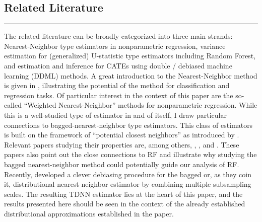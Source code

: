 \subsection{Related Literature}
\hrule
The related literature can be broadly categorized into three main strands: Nearest-Neighbor type estimators in nonparametric regression, variance estimation for (generalized) U-statistic type estimators including Random Forest, and estimation and inference for CATEs using double / debiased machine learning (DDML) methods.
A great introduction to the Nearest-Neighbor method is given in \citet{biau_lectures_2015}, illustrating the potential of the method for classification and regression tasks.
Of particular interest in the context of this paper are the so-called ``Weighted Nearest-Neighbor'' methods for nonparametric regression.
While this is a well-studied type of estimator in and of itself, I draw particular connections to bagged-nearest-neighbor type estimators.
This class of estimators is built on the framework of ``potential closest neighbors'' as introduced by \citet{lin_random_2006}.
Relevant papers studying their properties are, among others, \citet{biau_rate_2010}, \citet{biau_layered_2010}, and \citet{steele_exact_2009}.
These papers also point out the close connections to RF and illustrate why studying the bagged nearest-neighbor method could potentially guide our analysis of RF.
Recently, \citet{demirkaya_optimal_2024} developed a clever debiasing procedure for the bagged or, as they coin it, distributional nearest-neighbor estimator by combining multiple subsampling scales.
The resulting TDNN estimator lies at the heart of this paper, and the results presented here should be seen in the context of the already established distributional approximations established in the paper.

